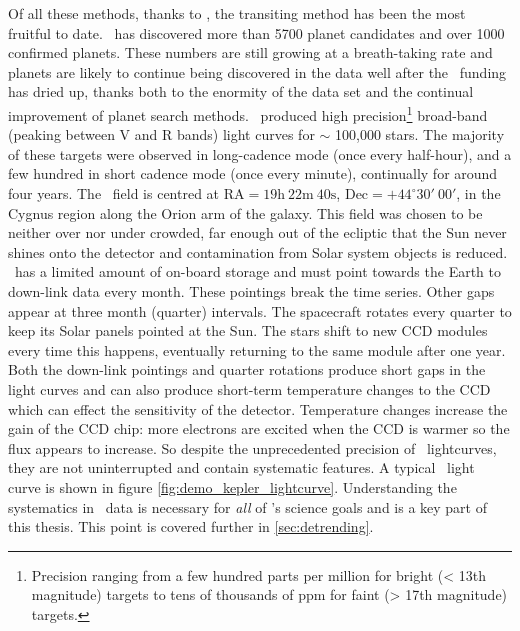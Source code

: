 Of all these methods, thanks to \kepler, the transiting method has been the
most fruitful to date.
\kepler\ has discovered more than 5700 planet candidates and over 1000
confirmed planets.
These numbers are still growing at a breath-taking rate and planets are likely
to continue being discovered in the data well after the \kepler\ funding has
dried up, thanks both to the enormity of the data set and the continual
improvement of planet search methods.
\kepler\ produced high precision\footnote{Precision ranging from a few hundred
parts per million for bright (< 13th magnitude) targets to tens of thousands
of ppm for faint (> 17th magnitude) targets.} broad-band (peaking between V
and R bands) light curves for $\sim$ 100,000 stars.
The majority of these targets were observed in long-cadence mode (once every
half-hour), and a few hundred in short cadence mode (once every minute),
continually for around four years.
The \kepler\ field is centred at $\mathrm{RA} = 19\mathrm{h}~22\mathrm{m}~
40\mathrm{s}$, $\mathrm{Dec} = +44^\circ30'~00'$, in the Cygnus region along
the Orion arm of the galaxy.
This field was chosen to be neither over nor under crowded, far enough out of
the ecliptic that the Sun never shines onto the detector and contamination
from Solar system objects is reduced.
\kepler\ has a limited amount of on-board storage and must point towards the
Earth to down-link data every month.
These pointings break the time series.
Other gaps appear at three month (quarter) intervals.
The spacecraft rotates every quarter to keep its Solar panels pointed at the
Sun.
The stars shift to new CCD modules every time this happens, eventually
returning to the same module after one year.
Both the down-link pointings and quarter rotations produce short gaps in the
light curves and can also produce short-term temperature changes to the CCD
which can effect the sensitivity of the detector.
Temperature changes increase the gain of the CCD chip: more electrons are
excited when the CCD is warmer so the flux appears to increase.
So despite the unprecedented precision of \kepler\ lightcurves, they are not
uninterrupted and contain systematic features.
A typical \kepler\ light curve is shown in figure
\ref{fig:demo_kepler_lightcurve}.
Understanding the systematics in \kepler\ data is necessary for {\it all} of
\kepler's science goals and is a key part of this thesis.
This point is covered further in \textsection \ref{sec:detrending}.

